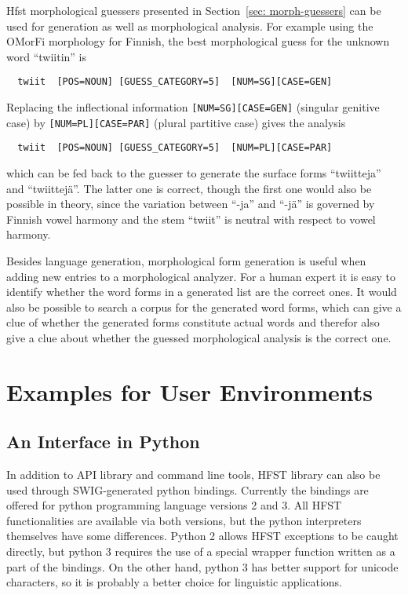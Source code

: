 \documentclass{llncs}
\begin{document}
Hfst morphological guessers presented in Section~\ref{sec:
  morph-guessers} can be used for generation as well as morphological
analysis. For example using the OMorFi morphology for Finnish, the
best morphological guess for the unknown word ``twiitin'' is
\begin{verbatim}
  twiit  [POS=NOUN] [GUESS_CATEGORY=5]  [NUM=SG][CASE=GEN]
\end{verbatim}
Replacing the inflectional information {\tt [NUM=SG][CASE=GEN]}
(singular genitive case) by {\tt [NUM=PL][CASE=PAR]} (plural
partitive case) gives the analysis
\begin{verbatim}
  twiit  [POS=NOUN] [GUESS_CATEGORY=5]  [NUM=PL][CASE=PAR]
\end{verbatim}
which can be fed back to the guesser to generate the surface forms
``twiitteja'' and ``twiittejä''. The latter one is correct, though the
first one would also be possible in theory, since the variation
between ``-ja'' and ``-jä'' is governed by Finnish vowel harmony and
the stem ``twiit'' is neutral with respect to vowel harmony.

Besides language generation, morphological form generation is useful
when adding new entries to a morphological analyzer. For a human
expert it is easy to identify whether the word forms in a generated
list are the correct ones. It would also be possible to search a
corpus for the generated word forms, which can give a clue of whether
the generated forms constitute actual words and therefor also give a
clue about whether the guessed morphological analysis is the correct
one.

\section{Examples for User Environments}

\subsection{An Interface in Python}

In addition to API library and command line tools, HFST library can
also be used through SWIG-generated python bindings. Currently the
bindings are offered for python programming language versions 2 and
3. All HFST functionalities are available via both versions, but the
python interpreters themselves have some differences.  Python 2 allows
HFST exceptions to be caught directly, but python 3 requires the use
of a special wrapper function written as a part of the bindings. On
the other hand, python 3 has better support for unicode characters, so
it is probably a better choice for linguistic applications.
\end{document}
